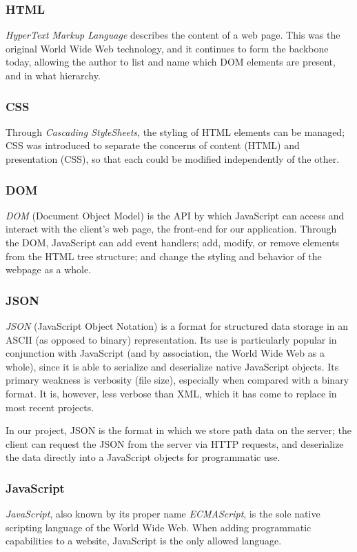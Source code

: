 \subsubsection{HTML}
\emph{HyperText Markup Language} describes the content of a web page. This was the original World Wide Web technology, and it continues to form the backbone today, allowing the author to list and name which DOM elements are present, and in what hierarchy.
\subsubsection{CSS}
Through \emph{Cascading StyleSheets}, the styling of HTML elements can be managed; CSS was introduced to separate the concerns of content (HTML) and presentation (CSS), so that each could be modified independently of the other.
\subsubsection{DOM}
\emph{DOM} (Document Object Model) is the API by which JavaScript can access and interact with the client's web page, the front-end for our application. Through the DOM, JavaScript can add event handlers; add, modify, or remove elements from the HTML tree structure; and change the styling and behavior of the webpage as a whole.
\subsubsection{JSON}
\emph{JSON} (JavaScript Object Notation) is a format for structured data storage in an ASCII (as opposed to binary) representation. Its use is particularly popular in conjunction with JavaScript (and by association, the World Wide Web as a whole), since it is able to serialize and deserialize native JavaScript objects. Its primary weakness is verbosity (file size), especially when compared with a binary format. It is, however, less verbose than XML, which it has come to replace in most recent projects.\par
In our project, JSON is the format in which we store path data on the server; the client can request the JSON from the server via HTTP requests, and deserialize the data directly into a JavaScript objects for programmatic use.
\subsubsection{JavaScript}
\emph{JavaScript}, also known by its proper name \emph{ECMAScript}, is the sole native scripting language of the World Wide Web. When adding programmatic capabilities to a website, JavaScript is the only allowed language.

